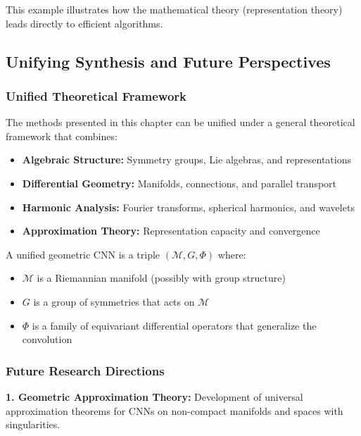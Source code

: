 This example illustrates how the mathematical theory (representation theory) leads directly to efficient algorithms.

\subsection{Unifying Synthesis and Future Perspectives}

\subsubsection{Unified Theoretical Framework}

The methods presented in this chapter can be unified under a general theoretical framework that combines:

\begin{itemize}
\item \textbf{Algebraic Structure:} Symmetry groups, Lie algebras, and representations
\item \textbf{Differential Geometry:} Manifolds, connections, and parallel transport
\item \textbf{Harmonic Analysis:} Fourier transforms, spherical harmonics, and wavelets
\item \textbf{Approximation Theory:} Representation capacity and convergence
\end{itemize}

\begin{definition}
A unified geometric CNN is a triple $(\mathcal{M}, G, \Phi)$ where:
\begin{itemize}
\item $\mathcal{M}$ is a Riemannian manifold (possibly with group structure)
\item $G$ is a group of symmetries that acts on $\mathcal{M}$
\item $\Phi$ is a family of equivariant differential operators that generalize the convolution
\end{itemize}
\end{definition}

\subsubsection{Future Research Directions}

\textbf{1. Geometric Approximation Theory:} Development of universal approximation theorems for CNNs on non-compact manifolds and spaces with singularities.


